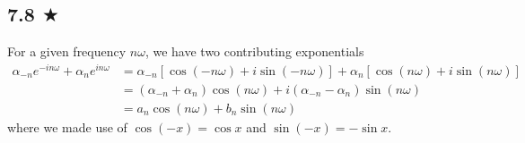 \subsection{7.8 $\bigstar$}
For a given frequency $n\omega$, we have two contributing exponentials 
\begin{align*}
\alpha_{-n} e^{-in \omega}+\alpha_n e^{in \omega}&=\alpha_{-n}[\cos (-n\omega)+i\sin (-n\omega)]+\alpha_n[\cos (n\omega)+i\sin (n\omega)]\\
&=(\alpha_{-n}+\alpha_n)\cos (n\omega)+i(\alpha_{-n}-\alpha_n)\sin (n\omega)\\
&=a_n\cos (n\omega)+b_n\sin (n\omega)
\end{align*} 
where we made use of $\cos(-x)=\cos x$ and $\sin (-x)=-\sin x$.







